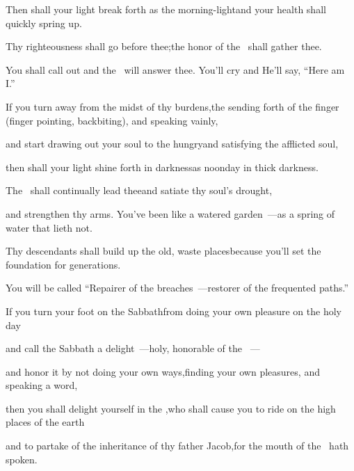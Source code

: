 \begin{inparaenum}
  \pb{} Then shall your light break forth as the morning-light\pa{}and your health shall quickly spring up.%

  \pb{}Thy righteousness shall go before thee;\pa{}the honor of the \lord\ shall gather thee.%

  \pb{} You shall call out and the \lord\ will answer thee. You'll cry and He'll say, ``Here am I.''%

  \pb{}If you turn away from the midst of thy burdens,\pa{}the sending forth of the finger (finger pointing, backbiting), and speaking vainly,%

  \pb{} and start drawing out your soul to the hungry\pa{}and satisfying the afflicted soul,%

  \pb{}then shall your light shine forth in darkness\pa{}as noonday in thick darkness.%

  \pb{} The \lord\ shall continually lead thee\pa{}and satiate thy soul's drought,%

  \pb{}and strengthen thy arms. You've been like a watered garden~---\pa{}as a spring of water that lieth not.%

  \pb{} Thy descendants shall build up the old, waste places\pa{}because you'll set the foundation for generations.%

  \pb{}You will be called ``Repairer of the breaches~---\pa{}restorer of the frequented paths.''%

  \pc{} If you turn your foot on the Sabbath\pa{}from doing your own pleasure on the holy day%

  \pb{}and call the Sabbath a delight~---\pa{}holy, honorable of the \lord~---%

  \pb{}and honor it by not doing your own ways,\pa{}finding your own pleasures, and speaking a word,%

  \pb{} then you shall delight yourself in the \lord,\pa{}who shall cause you to ride on the high places of the earth%

  \pb{}and to partake of the inheritance of thy father Jacob,\pa{}for the mouth of the \lord\ hath spoken.%
\end{inparaenum}
